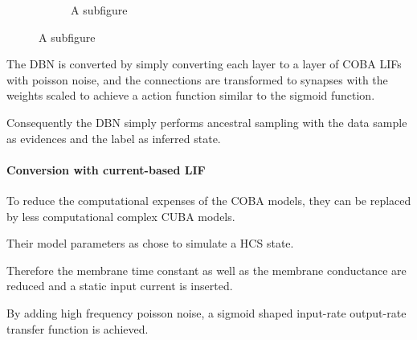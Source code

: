\begin{figure}
\begin{subfigure}[t]{.5\textwidth}
  		\caption{A subfigure}
  		\label{fig:sub2}
	\end{subfigure}
\end{figure}
  
The DBN is converted by simply converting each layer to a layer of COBA LIFs with poisson noise, and the connections are transformed to synapses with the weights scaled to achieve a action function similar to the sigmoid function.

Consequently the DBN simply performs ancestral sampling with the data sample as evidences and the label as inferred state.   


\paragraph{Conversion with current-based LIF}

To reduce the computational expenses of the COBA models, they can be replaced by less computational complex CUBA models.

Their model parameters as chose to simulate a HCS state.

Therefore the membrane time constant as well as the membrane conductance are reduced and a static input current is inserted.  

By adding high frequency poisson noise, a sigmoid shaped input-rate output-rate transfer function is achieved.

